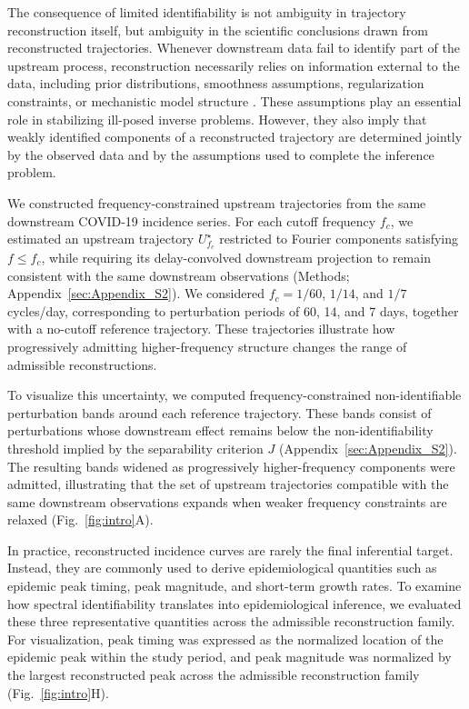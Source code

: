 The consequence of limited identifiability is not ambiguity in trajectory reconstruction itself, but ambiguity in the scientific conclusions drawn from reconstructed trajectories. Whenever downstream data fail to identify part of the upstream process, reconstruction necessarily relies on information external to the data, including prior distributions, smoothness assumptions, regularization constraints, or mechanistic model structure \cite{kaipio2005statistical, stuart2010inverse, miller2022statistical}. These assumptions play an essential role in stabilizing ill-posed inverse problems. However, they also imply that weakly identified components of a reconstructed trajectory are determined jointly by the observed data and by the assumptions used to complete the inference problem. 

We constructed frequency-constrained upstream trajectories from the same downstream COVID-19 incidence series. For each cutoff frequency \(f_c\), we estimated an upstream trajectory \(U^\star_{f_c}\) restricted to Fourier components satisfying \(f \leq f_c\), while requiring its delay-convolved downstream projection to remain consistent with the same downstream observations (Methods; Appendix~\ref{sec:Appendix_S2}). We considered \(f_c = 1/60\), \(1/14\), and \(1/7\) cycles/day, corresponding to perturbation periods of 60, 14, and 7 days, together with a no-cutoff reference trajectory. These trajectories illustrate how progressively admitting higher-frequency structure changes the range of admissible reconstructions.

To visualize this uncertainty, we computed frequency-constrained non-identifiable perturbation bands around each reference trajectory. These bands consist of perturbations whose downstream effect remains below the non-identifiability threshold implied by the separability criterion \(J\) (Appendix~\ref{sec:Appendix_S2}). The resulting bands widened as progressively higher-frequency components were admitted, illustrating that the set of upstream trajectories compatible with the same downstream observations expands when weaker frequency constraints are relaxed (Fig.~\ref{fig:intro}A).

In practice, reconstructed incidence curves are rarely the final inferential target. Instead, they are commonly used to derive epidemiological quantities such as epidemic peak timing, peak magnitude, and short-term growth rates. To examine how spectral identifiability translates into epidemiological inference, we evaluated these three representative quantities across the admissible reconstruction family. For visualization, peak timing was expressed as the normalized location of the epidemic peak within the study period, and peak magnitude was normalized by the largest reconstructed peak across the admissible reconstruction family (Fig.~\ref{fig:intro}H).

